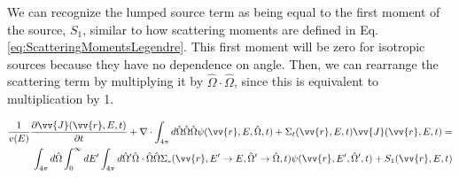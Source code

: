 \documentclass[10pt]{article}
\newcommand{\beqa}{\begin{equation}\begin{aligned}}
\newcommand{\eeqa}{\end{aligned}\end{equation}}
\newcommand{\hO}{\hat{\Omega}}
\newcommand{\spa}{(\vv{r}, E, \hO, t)}
\newcommand{\spas}{(\vv{r},E,t)}
\newcommand{\spap}{(\vv{r}, E', \hO',t)}
\newcommand{\spang}{(\vv{r},E'\rightarrow E, \hO'\rightarrow\hO,t)}
\begin{document}
\begin{flushleft}
We can recognize the lumped source term as being equal to the first moment of the source, \(S_1\), similar to how scattering moments are defined in Eq. \ref{eq:ScatteringMomentsLegendre}. This first moment will be zero for isotropic sources because they have no dependence on angle. Then, we can rearrange the scattering term by multiplying it by \(\hO  \cdot\hO  \), since this is equivalent to multiplication by 1. 

\beqa
\label{eq:TEAngleAngleIntegrated}
\frac{1}{v(E)} \frac{\partial\vv{J}\spas}{\partial t} +
 \nabla\cdot \int_{4\pi}^{} d\hO   \hO  \hO  \psi\spa  + 
 \Sigma_t\spas\vv{J}\spas = \\
 \int_{4\pi}^{} d\hO   \int_{0}^{\infty}dE' \int_{4\pi}^{ } d\hO  ' \hO  \cdot\hO   \hO  \Sigma_s\spang\psi\spap + S_1\spas\\
\eeqa

\end{flushleft}
\end{document}
